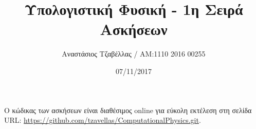 \documentclass[11pt]{article}
\begin{document}


\title{Υπολογιστική Φυσική - 1η Σειρά Ασκήσεων}
\author{Αναστάσιος Τζαβέλλας / ΑΜ:1110 2016 00255}
\date{07/11/2017}
\maketitle







Ο κώδικας των ασκήσεων είναι διαθέσιμος \textlatin{online} για εύκολη εκτέλεση στη σελίδα  URL: \url{https://github.com/tzavellas/ComputationalPhysics.git}.
\end{document}
